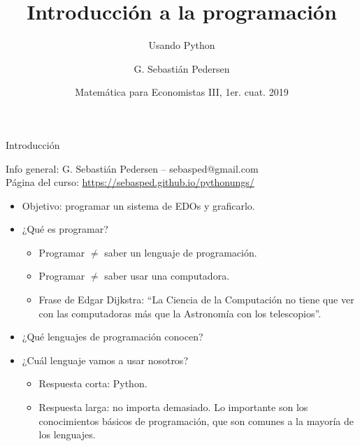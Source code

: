\documentclass{beamer}
\title[Intro Prog] %
{Introducción a la programación}
\subtitle
{Usando Python}
\author[SP]
{G. Sebastián Pedersen}%
\institute[UNGS] %
{
  Instituto de Industria\\
  Universidad Nacional de General Sarmiento
}
\date[] %
{Matemática para Economistas III, 1er. cuat. 2019}
\begin{document}
\begin{frame}
  \titlepage
\end{frame}

\begin{frame}{Introducción}
  \begin{block}{Info general:}
  	G. Sebastián Pedersen -- sebasped@gmail.com\\
  	
  	Página del curso: \url{https://sebasped.github.io/pythonungs/}
  \end{block}\pause
  \begin{itemize}
  	\item Objetivo: programar un sistema de EDOs y graficarlo.
	\pause
	\item ¿Qué es programar? \pause
		\begin{itemize}
			\item Programar $\neq$ saber un lenguaje de programación. \pause
			\item Programar $\neq$ saber usar una computadora. \pause
			\item Frase de Edgar Dijkstra: ``La Ciencia de la Computación no tiene que ver con las computadoras más que la Astronomía con los telescopios''.\pause
		\end{itemize}
	\item ¿Qué lenguajes de programación conocen?\pause
	\item ¿Cuál lenguaje vamos a usar nosotros?\pause
	\begin{itemize}
		\item Respuesta corta: Python. \pause
		\item Respuesta larga: no importa demasiado. Lo importante  son los conocimientos básicos de programación, que son comunes a la mayoría de los lenguajes.%
	\end{itemize}
  \end{itemize}

\end{frame}
\end{document}

